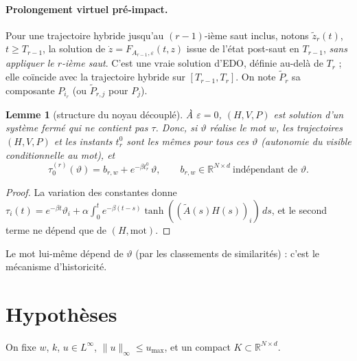 \documentclass[11pt,a4paper]{article}
\newtheorem{lemme}[theoreme]{Lemme}
\theoremstyle{remark}
\theoremstyle{definition}
\newcommand{\R}{\mathbb R}
\newcommand{\norm}[1]{\lVert #1\rVert}
\newcommand{\eps}{\varepsilon}
\newcommand{\vth}{\vartheta}
\newcommand{\zt}{\widetilde z}
\newcommand{\Pt}{\widetilde P}
\begin{document}
\paragraph{Prolongement virtuel pré-impact.} Pour une trajectoire hybride jusqu'au $(r-1)$-ième saut inclus, notons $\zt_r(t)$, $t\ge T_{r-1}$, la solution de $\dot z=F_{A_{r-1},\eps}(t,z)$ issue de l'état post-saut en $T_{r-1}$, \emph{sans appliquer le $r$-ième saut}. C'est une vraie solution d'EDO, définie au-delà de $T_r$ ; elle coïncide avec la trajectoire hybride sur $[T_{r-1},T_r]$. On note $\Pt_r$ sa composante $P_{i_r}$ (ou $\Pt_{r,j}$ pour $P_j$).

\begin{lemme}[structure du noyau découplé]\label{lem:dec}
À $\eps=0$, $(H,V,P)$ est solution d'un système fermé qui ne contient pas $\tau$. Donc, si $\vth$ réalise le mot $w$, les trajectoires $(H,V,P)$ et les instants $t_r^0$ sont les mêmes pour tous ces $\vth$ (autonomie du visible \emph{conditionnelle au mot}), et
\[
\tau_0^{(r)}(\vth)=b_{r,w}+e^{-\beta t_r^0}\,\vth,\qquad b_{r,w}\in\R^{N\times d}\ \text{indépendant de }\vth.
\]
\end{lemme}
\begin{proof}
La variation des constantes donne $\tau_i(t)=e^{-\beta t}\vth_i+\alpha\int_0^te^{-\beta(t-s)}\tanh((\tilde A(s)H(s))_i)\,ds$, et le second terme ne dépend que de $(H,\text{mot})$.
\end{proof}

Le mot lui-même dépend de $\vth$ (par les classements de similarités) : c'est le mécanisme d'historicité.

\section{Hypothèses}

On fixe $w$, $k$, $u\in L^\infty$, $\norm{u}_\infty\le u_{\max}$, et un compact $K\subset\R^{N\times d}$.
\end{document}
